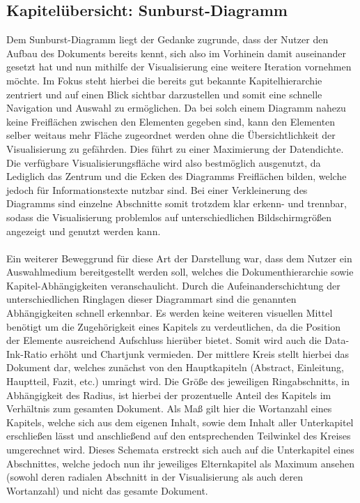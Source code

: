 \subsection{Kapitel\"ubersicht: Sunburst-Diagramm} \label{subsec:sunburst}
Dem Sunburst-Diagramm liegt der Gedanke zugrunde, dass der Nutzer den Aufbau des Dokuments bereits kennt, sich also im Vorhinein damit auseinander gesetzt hat und nun mithilfe der Visualisierung eine weitere Iteration vornehmen m\"ochte. Im Fokus steht hierbei die bereits gut bekannte Kapitelhierarchie zentriert und auf einen Blick sichtbar darzustellen und somit eine schnelle Navigation und Auswahl zu erm\"oglichen. Da bei solch einem Diagramm nahezu keine Freifl\"achen zwischen den Elementen gegeben sind, kann den Elementen selber weitaus mehr Fl\"ache zugeordnet werden ohne die \"Ubersichtlichkeit der Visualisierung zu gef\"ahrden. Dies f\"uhrt zu einer Maximierung der Datendichte. Die verf\"ugbare Visualisierungsfl\"ache wird also bestm\"oglich ausgenutzt, da Lediglich das Zentrum und die Ecken des Diagramms Freifl\"achen bilden, welche jedoch f\"ur Informationstexte nutzbar sind. Bei einer Verkleinerung des Diagramms sind einzelne Abschnitte somit trotzdem klar erkenn- und trennbar, sodass die Visualisierung problemlos auf unterschiedlichen Bildschirmgr\"o{\ss}en angezeigt und genutzt werden kann.\\
\\
Ein weiterer Beweggrund f\"ur diese Art der Darstellung war, dass dem Nutzer ein Auswahlmedium bereitgestellt werden soll, welches die Dokumenthierarchie sowie Kapitel-Abh\"angigkeiten veranschaulicht. Durch die Aufeinanderschichtung der unterschiedlichen Ringlagen dieser Diagrammart sind die genannten Abh\"angigkeiten schnell erkennbar. Es werden keine weiteren visuellen Mittel ben\"otigt um die Zugeh\"origkeit eines Kapitels zu verdeutlichen, da die Position der Elemente ausreichend Aufschluss hier\"uber bietet. Somit wird auch die Data-Ink-Ratio erh\"oht und Chartjunk vermieden. Der mittlere Kreis stellt hierbei das Dokument dar, welches zun\"achst von den Hauptkapiteln (Abstract, Einleitung, Hauptteil, Fazit, etc.) umringt wird. Die Gr\"o{\ss}e des jeweiligen Ringabschnitts, in Abh\"angigkeit des Radius, ist hierbei der prozentuelle Anteil des Kapitels im Verh\"altnis zum gesamten Dokument. Als Ma{\ss} gilt hier die Wortanzahl eines Kapitels, welche sich aus dem eigenen Inhalt, sowie dem Inhalt aller Unterkapitel erschlie{\ss}en l\"asst und anschlie{\ss}end auf den entsprechenden Teilwinkel des Kreises umgerechnet wird. Dieses Schemata erstreckt sich auch auf die Unterkapitel eines Abschnittes, welche jedoch nun ihr jeweiliges Elternkapitel als Maximum ansehen (sowohl deren radialen Abschnitt in der Visualisierung als auch deren Wortanzahl) und nicht das gesamte Dokument.\\
